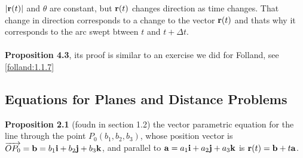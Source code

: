 $|\boldsymbol{\mathbf{r}}(t)|$ and $\theta$ are constant, but $\boldsymbol{\mathbf{r}}(t)$ changes direction as time changes.
That change in direction corresponds to a change to the vector $\boldsymbol{\mathbf{r}}(t)$ and thats
why it corresponds to the arc swept btween $t$ and $t+ \Delta t$.
\\~\\

\textbf{Proposition 4.3}, its proof is similar to an exercise we did for Folland, see
\ref{folland:1.1.7}


\subsection{Equations for Planes and Distance Problems}

\textbf{Proposition 2.1} (foudn in section 1.2)
the vector parametric equation for the line through the point $P_0 (b_1, b_2, b_3)$,
whose position vector is $\overrightarrow{OP_0} = \boldsymbol{\mathbf{b}} = b_1\boldsymbol{\mathbf{i}} + b_2\boldsymbol{\mathbf{j}} + b_3\boldsymbol{\mathbf{k}}$,
and parallel to $\boldsymbol{\mathbf{a}} = a_1\boldsymbol{\mathbf{i}} + a_2\boldsymbol{\mathbf{j}} + a_3\boldsymbol{\mathbf{k}}$ is $\boldsymbol{\mathbf{r}}(t) = \boldsymbol{\mathbf{b}} + t\boldsymbol{\mathbf{a}}$.